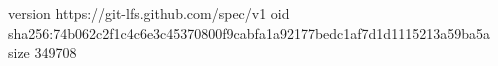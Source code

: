 version https://git-lfs.github.com/spec/v1
oid sha256:74b062c2f1c4c6e3c45370800f9cabfa1a92177bedc1af7d1d1115213a59ba5a
size 349708
